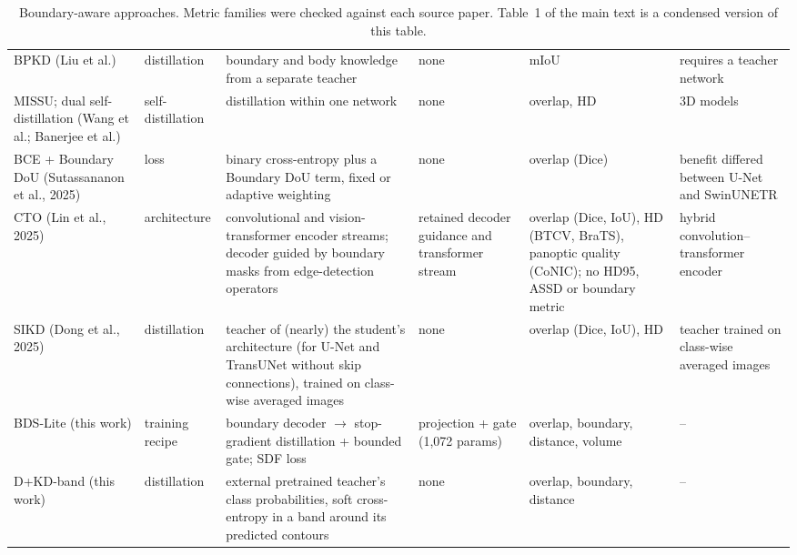 \documentclass[10pt]{article}
\begin{document}
\begin{table}[!htbp]
{\begin{tabular}{p{2.6cm}p{1.8cm}p{3.8cm}p{1.6cm}p{2.6cm}p{3.6cm}}
BPKD (Liu et al.) & distillation & boundary and body knowledge from a separate teacher & none & mIoU & requires a teacher network \\
MISSU; dual self-distillation (Wang et al.; Banerjee et al.) & self-distillation & distillation within one network & none & overlap, HD & 3D models \\
BCE + Boundary DoU (Sutassananon et al., 2025) & loss & binary cross-entropy plus a Boundary DoU term, fixed or adaptive weighting & none & overlap (Dice) & benefit differed between U-Net and SwinUNETR \\
CTO (Lin et al., 2025) & architecture & convolutional and vision-transformer encoder streams; decoder guided by boundary masks from edge-detection operators & retained decoder guidance and transformer stream & overlap (Dice, IoU), HD (BTCV, BraTS), panoptic quality (CoNIC); no HD95, ASSD or boundary metric & hybrid convolution--transformer encoder \\
SIKD (Dong et al., 2025) & distillation & teacher of (nearly) the student's architecture (for U-Net and TransUNet without skip connections), trained on class-wise averaged images & none & overlap (Dice, IoU), HD & teacher trained on class-wise averaged images \\
BDS-Lite (this work) & training recipe & boundary decoder $\to$ stop-gradient distillation + bounded gate; SDF loss & projection + gate (1,072 params) & overlap, boundary, distance, volume & -- \\
D+KD-band (this work) & distillation & external pretrained teacher's class probabilities, soft cross-entropy in a band around its predicted contours & none & overlap, boundary, distance & -- \\
\bottomrule
\end{tabular}}
\caption{\label{tab:s-methods}Boundary-aware approaches. Metric families were checked against each source paper. Table~1 of the main text is a condensed version of this table.}
\end{table}
\FloatBarrier
\end{document}

